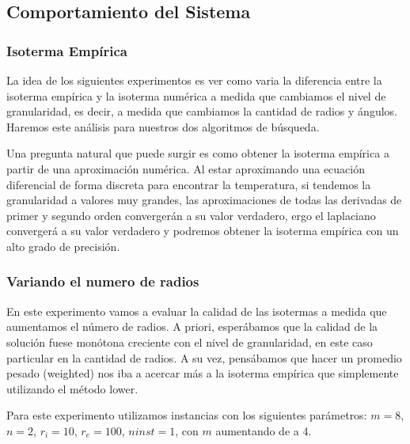 \newpage
\subsection{Comportamiento del Sistema}

\subsubsection{Isoterma Empírica}

La idea de los siguientes experimentos es ver como varia la diferencia entre la isoterma empírica y la isoterma numérica a medida que cambiamos el nivel de granularidad, es decir, a medida que cambiamos la cantidad de radios y ángulos. Haremos este análisis para nuestros dos algoritmos de búsqueda.

Una pregunta natural que puede surgir es como obtener la isoterma empírica a partir de una aproximación numérica. Al estar aproximando una ecuación diferencial de forma discreta para encontrar la temperatura, si tendemos la granularidad a valores muy grandes, las aproximaciones de todas las derivadas de primer y segundo orden convergerán a su valor verdadero, ergo el laplaciano convergerá a su valor verdadero y podremos obtener la isoterma empírica con un alto grado de precisión.

\subsubsection{Variando el numero de radios}

En este experimento vamos a evaluar la calidad de las isotermas a medida que aumentamos el número de radios. A priori, esperábamos que la calidad de la solución fuese monótona creciente con el nivel de granularidad, en este caso particular en la cantidad de radios. A su vez, pensábamos que hacer un promedio pesado (weighted) nos iba a acercar más a la isoterma empírica que simplemente utilizando el método lower.

Para este experimento utilizamos instancias con los siguientes parámetros: $m = 8$, $n = 2$, $r_i = 10$, $r_e = 100$, $ninst = 1$, con $m$ aumentando de a 4. 

